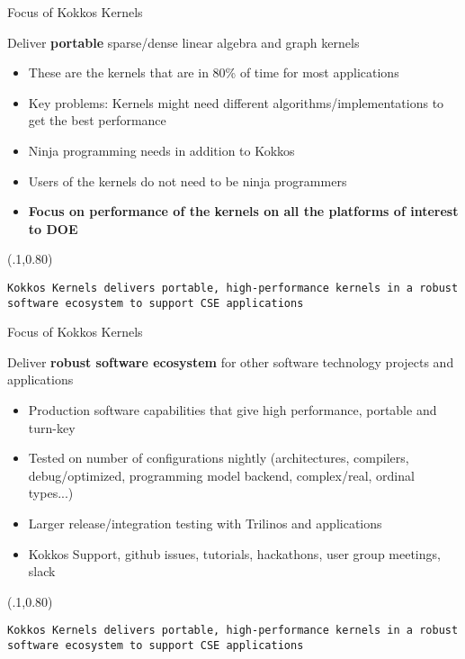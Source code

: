 
\begin{frame}[fragile]{Focus of Kokkos Kernels}

Deliver \textbf{portable} sparse/dense linear algebra and graph kernels
\begin{itemize}
  \item These are the kernels that are in 80\% of time for most applications
  \item Key problems: Kernels might need different algorithms/implementations to get the best performance
  \item Ninja programming needs in addition to Kokkos
  \item Users of the kernels do not need to be ninja programmers
  \item \textbf{Focus on performance of the kernels on all the platforms of interest to DOE}
\end{itemize}

\begin{textblock*}{1.0\textwidth}(.1\textwidth,0.80\textheight)
  \begin{lstlisting}[frame=single, backgroundcolor=\color{blue!10}, basicstyle=\tiny, breaklines=true, boxpos=c]
    Kokkos Kernels delivers portable, high-performance kernels in a robust software ecosystem to support CSE applications
  \end{lstlisting}
\end{textblock*}

\end{frame}

\begin{frame}[fragile]{Focus of Kokkos Kernels}

Deliver \textbf{robust software ecosystem} for other software technology projects and applications
\begin{itemize}
  \item Production software capabilities that give high performance, portable and turn-key
  \item Tested on number of configurations nightly  (architectures, compilers, debug/optimized, programming model backend, complex/real, ordinal types...)
  \item Larger release/integration testing with Trilinos and applications
  \item Kokkos Support, github issues, tutorials, hackathons, user group meetings, slack
\end{itemize}

\begin{textblock*}{1.0\textwidth}(.1\textwidth,0.80\textheight)
  \begin{lstlisting}[frame=single, backgroundcolor=\color{blue!10}, basicstyle=\tiny, breaklines=true, boxpos=c]
    Kokkos Kernels delivers portable, high-performance kernels in a robust software ecosystem to support CSE applications
  \end{lstlisting}
\end{textblock*}

\end{frame}


